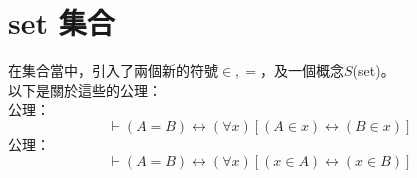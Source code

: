 \documentclass{article}
\newcommand{\sd}[1]{{\left(#1\right)}}
\newcommand{\axm}{公理：}
\newcommand{\md}[1]{{\left[#1\right]}}
\begin{document}
\section{set 集合}
在集合當中，引入了兩個新的符號$\in, =$，及一個概念$S$(set)。\\
以下是關於這些的公理：\\
\axm\\
\begin{equation}\label{set:A1}
	\vdash \sd{A = B} \leftrightarrow \sd{\forall x}\md{\sd{A \in x} \leftrightarrow \sd{B \in x}}
\end{equation}
\axm\\
\begin{equation}\label{set:A2}
	\vdash \sd{A = B} \leftrightarrow \sd{\forall x}\md{\sd{x \in A} \leftrightarrow \sd{x \in B}}
\end{equation}
\end{document}
